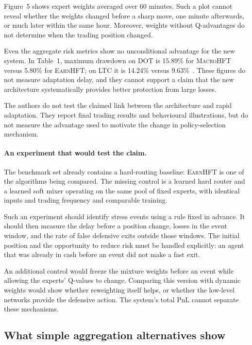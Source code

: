 \documentclass[9pt,a4paper,twocolumn]{extarticle}
\newcommand{\Macro}{\textsc{MacroHFT}}
\newcommand{\Earn}{\textsc{EarnHFT}}
\begin{document}
Figure~5 shows expert weights averaged over 60 minutes. Such a plot cannot reveal whether the
weights changed before a sharp move, one minute afterwards, or much later within the same hour.
Moreover, weights without Q-advantages do not determine when the trading position changed.

Even the aggregate risk metrics show no unconditional advantage for the new system. In Table~1,
maximum drawdown on DOT is 15.89\% for \Macro{} versus 5.80\% for \Earn{}; on LTC it is 14.24\%
versus 9.63\%~\cite{zong2024macrohft}. These figures do not measure adaptation delay, and they
cannot support a claim that the new architecture systematically provides better protection from
large losses.

The authors do not test the claimed link between the architecture and rapid adaptation. They
report final trading results and behavioural illustrations, but do not measure the advantage
used to motivate the change in policy-selection mechanism.

\paragraph{An experiment that would test the claim.}

The benchmark set already contains a hard-routing baseline: \Earn{} is one of the algorithms
being compared. The missing control is a learned hard router and a learned soft mixer operating
on the same pool of fixed experts, with identical inputs and trading frequency and comparable
training.

Such an experiment should identify stress events using a rule fixed in advance. It should then
measure the delay before a position change, losses in the event window, and the rate of false
defensive exits outside those windows. The initial position and the opportunity to reduce risk
must be handled explicitly: an agent that was already in cash before an event did not make a fast
exit.

An additional control would freeze the mixture weights before an event while allowing the
experts' Q-values to change. Comparing this version with dynamic weights would show whether
reweighting itself helps, or whether the low-level networks provide the defensive action. The
system's total PnL cannot separate these mechanisms.

\subsection{What simple aggregation alternatives show}
\label{sec:aggregation_experiments}
\end{document}
